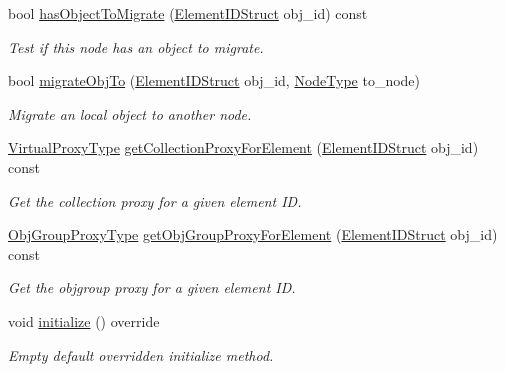 \begin{DoxyCompactItemize}
bool \hyperlink{structvt_1_1vrt_1_1collection_1_1balance_1_1_node_l_b_data_af025247a42d9b3ff6ba476714aad42fa}{has\+Object\+To\+Migrate} (\hyperlink{namespacevt_1_1vrt_1_1collection_1_1balance_a9f5b53fafb270212279a4757d2c4cd28}{Element\+I\+D\+Struct} obj\+\_\+id) const
\begin{DoxyCompactList}\small\item\em Test if this node has an object to migrate. \end{DoxyCompactList}\item 
bool \hyperlink{structvt_1_1vrt_1_1collection_1_1balance_1_1_node_l_b_data_a66619f696c49ce53d005f4b9ebbf12a2}{migrate\+Obj\+To} (\hyperlink{namespacevt_1_1vrt_1_1collection_1_1balance_a9f5b53fafb270212279a4757d2c4cd28}{Element\+I\+D\+Struct} obj\+\_\+id, \hyperlink{namespacevt_a866da9d0efc19c0a1ce79e9e492f47e2}{Node\+Type} to\+\_\+node)
\begin{DoxyCompactList}\small\item\em Migrate an local object to another node. \end{DoxyCompactList}\item 
\hyperlink{namespacevt_a1b417dd5d684f045bb58a0ede70045ac}{Virtual\+Proxy\+Type} \hyperlink{structvt_1_1vrt_1_1collection_1_1balance_1_1_node_l_b_data_a7f815606907a31f74428f058c220bf54}{get\+Collection\+Proxy\+For\+Element} (\hyperlink{namespacevt_1_1vrt_1_1collection_1_1balance_a9f5b53fafb270212279a4757d2c4cd28}{Element\+I\+D\+Struct} obj\+\_\+id) const
\begin{DoxyCompactList}\small\item\em Get the collection proxy for a given element ID. \end{DoxyCompactList}\item 
\hyperlink{namespacevt_ad7cae989df485fccca57f0792a880a8e}{Obj\+Group\+Proxy\+Type} \hyperlink{structvt_1_1vrt_1_1collection_1_1balance_1_1_node_l_b_data_a1f410baa1f6a5088a814fdcda87ff6d4}{get\+Obj\+Group\+Proxy\+For\+Element} (\hyperlink{namespacevt_1_1vrt_1_1collection_1_1balance_a9f5b53fafb270212279a4757d2c4cd28}{Element\+I\+D\+Struct} obj\+\_\+id) const
\begin{DoxyCompactList}\small\item\em Get the objgroup proxy for a given element ID. \end{DoxyCompactList}\item 
void \hyperlink{structvt_1_1vrt_1_1collection_1_1balance_1_1_node_l_b_data_aa489e1252abac8237d30bb0110ad36f9}{initialize} () override
\begin{DoxyCompactList}\small\item\em Empty default overridden initialize method. \end{DoxyCompactList}\item 

\end{DoxyCompactItemize}
